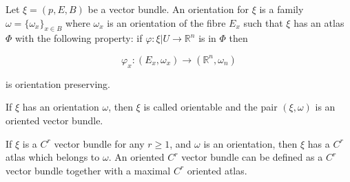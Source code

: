 Let $\xi = (p, E, B)$ be a vector bundle. An orientation for $\xi$ is a family $\omega = \{\omega_x\}_{x \in B}$ where $\omega_x$ is an orientation of the fibre $E_x$ such that $\xi$ has an atlas $\Phi$ with the following property: if $\varphi: \xi|U \to \mathbb{R}^n$ is in $\Phi$ then

$$\varphi_x: (E_x, \omega_x) \to (\mathbb{R}^n, \omega_n)$$

is orientation preserving.

If $\xi$ has an orientation $\omega$, then $\xi$ is called orientable and the pair $(\xi, \omega)$ is an oriented vector bundle.

If $\xi$ is a $C^r$ vector bundle for any $r \geqslant 1$, and $\omega$ is an orientation, then $\xi$ has a $C^r$ atlas which belongs to $\omega$. An oriented $C^r$ vector bundle can be defined as a $C^r$ vector bundle together with a maximal $C^r$ oriented atlas.
